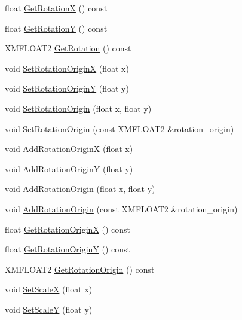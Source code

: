 \begin{DoxyCompactItemize}
\item 
float \hyperlink{structmage_1_1_sprite_transform_aca434c08aa95b3b2892690cb7b4dc241}{Get\+RotationX} () const
\item 
float \hyperlink{structmage_1_1_sprite_transform_ad906e19391e8e886343f6b1ceca5f439}{Get\+RotationY} () const
\item 
X\+M\+F\+L\+O\+A\+T2 \hyperlink{structmage_1_1_sprite_transform_a920ceef57a62d4835b907dd2c910f15b}{Get\+Rotation} () const
\item 
void \hyperlink{structmage_1_1_sprite_transform_a8b41bee9010d31027b2c1c40b393a4f5}{Set\+Rotation\+OriginX} (float x)
\item 
void \hyperlink{structmage_1_1_sprite_transform_affd054e4f5602930b84a21b1637b657a}{Set\+Rotation\+OriginY} (float y)
\item 
void \hyperlink{structmage_1_1_sprite_transform_a48e720840181b0da09989b739102c294}{Set\+Rotation\+Origin} (float x, float y)
\item 
void \hyperlink{structmage_1_1_sprite_transform_ab8eb3ba0c307d8267486f016da679e3e}{Set\+Rotation\+Origin} (const X\+M\+F\+L\+O\+A\+T2 \&rotation\+\_\+origin)
\item 
void \hyperlink{structmage_1_1_sprite_transform_a2ee0eacdef5904f5f95ec5dd306bb56e}{Add\+Rotation\+OriginX} (float x)
\item 
void \hyperlink{structmage_1_1_sprite_transform_a47808a3521d3c083b3fd0203fbd21b5c}{Add\+Rotation\+OriginY} (float y)
\item 
void \hyperlink{structmage_1_1_sprite_transform_a70a7fa7de4a563e4093400c3f60effbe}{Add\+Rotation\+Origin} (float x, float y)
\item 
void \hyperlink{structmage_1_1_sprite_transform_a16689c2da63a2b59186950cb9936d695}{Add\+Rotation\+Origin} (const X\+M\+F\+L\+O\+A\+T2 \&rotation\+\_\+origin)
\item 
float \hyperlink{structmage_1_1_sprite_transform_abf3a72d9f594aa157608070d69f4428e}{Get\+Rotation\+OriginX} () const
\item 
float \hyperlink{structmage_1_1_sprite_transform_a0f6056a96c419817211efce6687e1d89}{Get\+Rotation\+OriginY} () const
\item 
X\+M\+F\+L\+O\+A\+T2 \hyperlink{structmage_1_1_sprite_transform_af3a00260c5346a32a9f81efcf0f48a6a}{Get\+Rotation\+Origin} () const
\item 
void \hyperlink{structmage_1_1_sprite_transform_a90394102afd9d31dd426668aea210ed0}{Set\+ScaleX} (float x)
\item 
void \hyperlink{structmage_1_1_sprite_transform_a321067fab6d62931e17f1604ce50709d}{Set\+ScaleY} (float y)

\end{DoxyCompactItemize}
